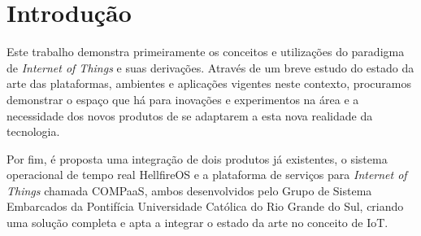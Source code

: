 \section{Introdução}
Este trabalho demonstra primeiramente os conceitos e utilizações do paradigma de
\textit{Internet of Things} e suas derivações. Através de um breve estudo do estado
da arte das plataformas, ambientes e aplicações vigentes neste contexto, procuramos
demonstrar o espaço que há para inovações e experimentos na área e a necessidade
dos novos produtos de se adaptarem a esta nova realidade da tecnologia.

Por fim, é proposta uma integração de dois produtos já existentes, o sistema
operacional de tempo real HellfireOS e a plataforma de serviços para \textit{Internet of Things}
chamada COMPaaS, ambos desenvolvidos pelo Grupo de Sistema Embarcados da Pontifícia Universidade
Católica do Rio Grande do Sul, criando uma solução completa e apta a integrar o estado da
arte no conceito de IoT.
